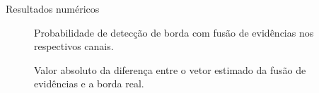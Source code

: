 \documentclass[10pt]{beamer}
\begin{document}
\begin{frame}{Resultados numéricos}
\begin{figure}[hbt]
	\caption{Probabilidade de detecção de borda com fusão de evidências nos respectivos canais.}
\endminipage\hfill
{}
	\caption{Valor absoluto da diferença entre o vetor estimado da fusão de evidências e a borda real.}
\endminipage\hfill
\end{figure}
\end{frame}
\end{document}
